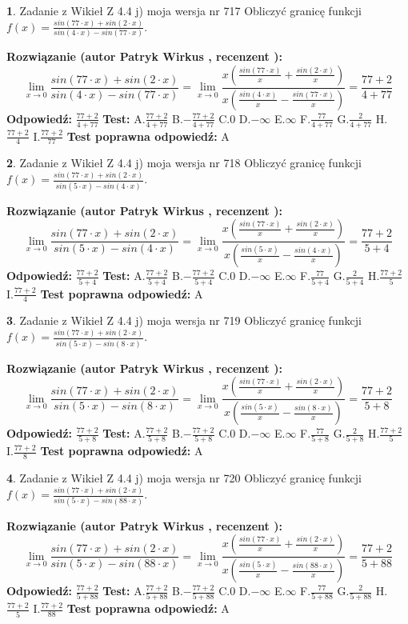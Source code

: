 \documentclass[12pt, a4paper]{article}
\theoremstyle{definition} %
\newtheorem{zad}{}
\newcommand{\zadStart}[1]{\begin{zad}#1\newline}
\newcommand{\zadStop}{\end{zad}}
\newcommand{\rozwStart}[2]{\noindent \textbf{Rozwiązanie (autor #1 , recenzent #2): }\newline}
\newcommand{\rozwStop}{\newline}
\newcommand{\odpStart}{\noindent \textbf{Odpowiedź:}\newline}
\newcommand{\odpStop}{\newline}
\newcommand{\testStart}{\noindent \textbf{Test:}\newline}
\newcommand{\testStop}{\newline}
\newcommand{\kluczStart}{\noindent \textbf{Test poprawna odpowiedź:}\newline}
\newcommand{\kluczStop}{\newline}
\begin{document}
\zadStart{Zadanie z Wikieł Z 4.4 j) moja wersja nr 717}
Obliczyć granicę funkcji $f(x)=\frac{sin(77\cdot x) +sin(2\cdot x)}{sin(4\cdot x) -sin(77\cdot x)}$.
\zadStop
\rozwStart{Patryk Wirkus}{}
$$\lim\limits_{x\to 0}\frac{sin(77\cdot x) +sin(2\cdot x)}{sin(4\cdot x) -sin(77\cdot x)}=\lim\limits_{x\to 0}\frac{x(\frac{sin(77\cdot x)}{x}+\frac{sin(2\cdot x)}{x})}{x(\frac{sin(4\cdot x)}{x}-\frac{sin(77\cdot x)}{x})}=\frac{77+2}{4+77}$$
\rozwStop
\odpStart
$\frac{77+2}{4+77}$
\odpStop
\testStart
A.$\frac{77+2}{4+77}$
B.$-\frac{77+2}{4+77}$
C.$0$
D.$-\infty$
E.$\infty$
F.$\frac{77}{4+77}$
G.$\frac{2}{4+77}$
H.$\frac{77+2}{4}$
I.$\frac{77+2}{77}$
\testStop
\kluczStart
A
\kluczStop



\zadStart{Zadanie z Wikieł Z 4.4 j) moja wersja nr 718}
Obliczyć granicę funkcji $f(x)=\frac{sin(77\cdot x) +sin(2\cdot x)}{sin(5\cdot x) -sin(4\cdot x)}$.
\zadStop
\rozwStart{Patryk Wirkus}{}
$$\lim\limits_{x\to 0}\frac{sin(77\cdot x) +sin(2\cdot x)}{sin(5\cdot x) -sin(4\cdot x)}=\lim\limits_{x\to 0}\frac{x(\frac{sin(77\cdot x)}{x}+\frac{sin(2\cdot x)}{x})}{x(\frac{sin(5\cdot x)}{x}-\frac{sin(4\cdot x)}{x})}=\frac{77+2}{5+4}$$
\rozwStop
\odpStart
$\frac{77+2}{5+4}$
\odpStop
\testStart
A.$\frac{77+2}{5+4}$
B.$-\frac{77+2}{5+4}$
C.$0$
D.$-\infty$
E.$\infty$
F.$\frac{77}{5+4}$
G.$\frac{2}{5+4}$
H.$\frac{77+2}{5}$
I.$\frac{77+2}{4}$
\testStop
\kluczStart
A
\kluczStop



\zadStart{Zadanie z Wikieł Z 4.4 j) moja wersja nr 719}
Obliczyć granicę funkcji $f(x)=\frac{sin(77\cdot x) +sin(2\cdot x)}{sin(5\cdot x) -sin(8\cdot x)}$.
\zadStop
\rozwStart{Patryk Wirkus}{}
$$\lim\limits_{x\to 0}\frac{sin(77\cdot x) +sin(2\cdot x)}{sin(5\cdot x) -sin(8\cdot x)}=\lim\limits_{x\to 0}\frac{x(\frac{sin(77\cdot x)}{x}+\frac{sin(2\cdot x)}{x})}{x(\frac{sin(5\cdot x)}{x}-\frac{sin(8\cdot x)}{x})}=\frac{77+2}{5+8}$$
\rozwStop
\odpStart
$\frac{77+2}{5+8}$
\odpStop
\testStart
A.$\frac{77+2}{5+8}$
B.$-\frac{77+2}{5+8}$
C.$0$
D.$-\infty$
E.$\infty$
F.$\frac{77}{5+8}$
G.$\frac{2}{5+8}$
H.$\frac{77+2}{5}$
I.$\frac{77+2}{8}$
\testStop
\kluczStart
A
\kluczStop



\zadStart{Zadanie z Wikieł Z 4.4 j) moja wersja nr 720}
Obliczyć granicę funkcji $f(x)=\frac{sin(77\cdot x) +sin(2\cdot x)}{sin(5\cdot x) -sin(88\cdot x)}$.
\zadStop
\rozwStart{Patryk Wirkus}{}
$$\lim\limits_{x\to 0}\frac{sin(77\cdot x) +sin(2\cdot x)}{sin(5\cdot x) -sin(88\cdot x)}=\lim\limits_{x\to 0}\frac{x(\frac{sin(77\cdot x)}{x}+\frac{sin(2\cdot x)}{x})}{x(\frac{sin(5\cdot x)}{x}-\frac{sin(88\cdot x)}{x})}=\frac{77+2}{5+88}$$
\rozwStop
\odpStart
$\frac{77+2}{5+88}$
\odpStop
\testStart
A.$\frac{77+2}{5+88}$
B.$-\frac{77+2}{5+88}$
C.$0$
D.$-\infty$
E.$\infty$
F.$\frac{77}{5+88}$
G.$\frac{2}{5+88}$
H.$\frac{77+2}{5}$
I.$\frac{77+2}{88}$
\testStop
\kluczStart
A
\kluczStop
\end{document}
